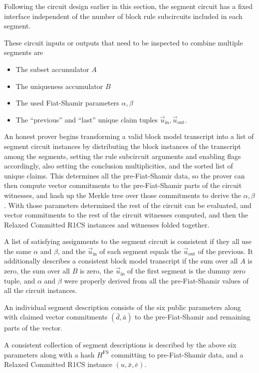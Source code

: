 \documentclass{article}
\theoremstyle{plain}
\theoremstyle{definition}
\begin{document}
Following the circuit design earlier in this section, the
segment circuit has a fixed interface independent of the number
of block rule subcircuits included in each segment.

These circuit inputs or outputs that need to be inspected to combine multiple
segments are
\begin{itemize}
\setlength\itemsep{0em}
\item The subset accumulator $A$
\item The uniqueness accumulator $B$
\item The used Fiat-Shamir parameters $\alpha, \beta$
\item The ``previous'' and ``last'' unique claim tuples $\vec{u}_{\mathrm{in}}, \vec{u}_{\mathrm{out}}$.
\end{itemize}

An honest prover begins transforming a valid block model transcript into a list of segment circuit
instances by distributing the block instances of the transcript among the segments,
setting the rule subcircuit arguments and enabling flags accordingly,
also setting the conclusion multiplicities, and the sorted list of unique claims.
This determines all the pre-Fiat-Shamir data, so the prover can then compute vector
commitments to the pre-Fiat-Shamir parts of the circuit witnesses, and hash up
the Merkle tree over those commitments to derive the $\alpha, \beta$.
With those parameters determined the rest of the circuit can be evaluated,
and vector commitments to the rest of the circuit witnesses computed,
and then the Relaxed Committed R1CS instances and witnesses folded together.

A list of satisfying assignments to the segment circuit is consistent if
they all use the same $\alpha$ and $\beta$, and the $\vec{u}_{\mathrm{in}}$ of
each segment equals the $\vec{u}_{\mathrm{out}}$ of the previous.
It additionally describes a consistent block model transcript if
the sum over all $A$ is zero, the sum over all $B$ is zero, the $\vec{u}_{\mathrm{in}}$ of
the first segment is the dummy zero tuple, and $\alpha$ and $\beta$ were properly derived from all
the pre-Fiat-Shamir values of all the circuit instances.

An individual segment description consists of the
six public parameters along with claimed vector commitments
$(\bar{d},\bar{a})$ to the pre-Fiat-Shamir and remaining parts of the vector.

A consistent collection of segment descriptions is described by the above six
parameters along with a hash $H^{\mathrm{FS}}$ committing to pre-Fiat-Shamir data,
and a Relaxed Committed R1CS instance $(u,\bar{x},\bar{e})$.
\end{document}

